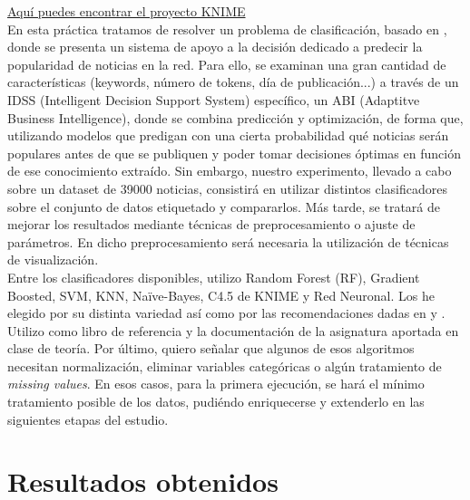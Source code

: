 \href{https://consigna.ugr.es/f/tsFMHLeXJihLASdx/P1-Balderas-Ruiz-Luis.zip}{Aquí puedes encontrar el proyecto KNIME} \\


En esta práctica tratamos de resolver un problema de clasificación, basado en \cite{main-article}, donde se presenta un sistema de apoyo a la decisión dedicado a predecir la popularidad de noticias en la red. Para ello, se examinan una gran cantidad de características (keywords, número de tokens, día de publicación...) a través de un IDSS (Intelligent Decision Support System) específico, un ABI (Adaptitve Business Intelligence), donde se combina predicción y optimización, de forma que, utilizando modelos que predigan con una cierta probabilidad qué noticias serán populares antes de que se publiquen y poder tomar decisiones óptimas en función de ese conocimiento extraído. Sin embargo, nuestro experimento, llevado a cabo sobre un dataset de 39000 noticias, consistirá en utilizar distintos clasificadores sobre el conjunto de datos etiquetado y compararlos. Más tarde, se tratará de mejorar los resultados mediante técnicas de preprocesamiento o ajuste de parámetros. En dicho preprocesamiento será necesaria la utilización de técnicas de visualización. \\

Entre los clasificadores disponibles, utilizo Random Forest (RF), Gradient Boosted, SVM, KNN, Naïve-Bayes, C4.5 de KNIME y Red Neuronal. Los he elegido por su distinta variedad así como por las recomendaciones dadas en \cite{choosing1} y \cite{choosing2}. Utilizo \cite{data_mining_book} como libro de referencia y la documentación de la asignatura aportada en clase de teoría. Por último, quiero señalar que algunos de esos algoritmos necesitan normalización, eliminar variables categóricas o algún tratamiento de \textit{missing values}. En esos casos, para la primera ejecución, se hará el mínimo tratamiento posible de los datos, pudiéndo enriquecerse y extenderlo en las siguientes etapas del estudio.




\section{Resultados obtenidos}

